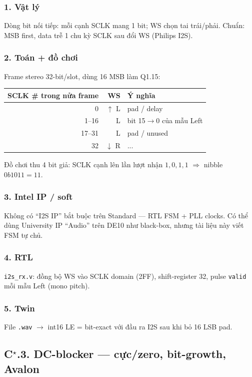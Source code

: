 \subsubsection*{1. Vật lý}
Dòng bit nối tiếp: mỗi cạnh SCLK mang 1 bit; WS chọn tai trái/phải. Chuẩn: MSB first, data trễ 1 chu kỳ SCLK sau đổi WS (Philips I2S).

\subsubsection*{2. Toán + đồ chơi}
Frame stereo 32-bit/slot, dùng 16 MSB làm Q1.15:
\begin{center}\small
\begin{tabular}{@{}rrl@{}}
\toprule
SCLK \# trong nửa frame & WS & Ý nghĩa \\
\midrule
0 & $\uparrow$ L & pad / delay \\
1--16 & L & bit 15$\to$0 của mẫu Left \\
17--31 & L & pad / unused \\
32 & $\downarrow$ R & ... \\
\bottomrule
\end{tabular}
\end{center}
Đồ chơi thu 4 bit giả: SCLK cạnh lên lần lượt nhận $1,0,1,1$ $\Rightarrow$ nibble $0b1011=11$.

\subsubsection*{3. Intel IP / soft}
Không có ``I2S IP'' bắt buộc trên Standard --- RTL FSM + PLL clocks. Có thể dùng University IP ``Audio'' trên DE10 như black-box, nhưng tài liệu này viết FSM tự chủ.

\subsubsection*{4. RTL}
\texttt{i2s\_rx.v}: đồng bộ WS vào SCLK domain (2FF), shift-register 32, pulse \texttt{valid} mỗi mẫu Left (mono pitch).

\subsubsection*{5. Twin}
File \texttt{.wav} $\to$ int16 LE = bit-exact với đầu ra I2S sau khi bỏ 16 LSB pad.

\subsection*{C$^\star$.3. DC-blocker --- cực/zero, bit-growth, Avalon}

